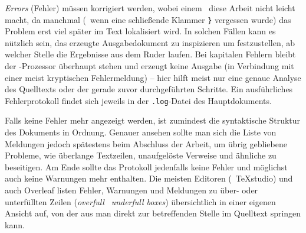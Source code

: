 \noindent
\emph{Errors} (Fehler) müssen korrigiert werden, wobei einem \latex\ diese
Arbeit nicht leicht macht, da manchmal (\zB\ wenn eine schließende Klammer
\verb!}! vergessen wurde) das Problem erst viel später im Text lokalisiert
wird. In solchen Fällen kann es nützlich sein, das erzeugte Ausgabedokument
zu inspizieren um festzustellen, ab welcher Stelle die Ergebnisse aus dem
Ruder laufen. Bei kapitalen Fehlern bleibt der \latex-Prozessor überhaupt
stehen und erzeugt keine Ausgabe (in Verbindung mit einer meist kryptischen
Fehlermeldung) -- hier hilft meist nur eine genaue Analyse des Quelltexts
oder der gerade zuvor durchgeführten Schritte. Ein ausführliches
Fehlerprotokoll findet sich jeweils in der \verb!.log!-Datei des Hauptdokuments.

Falls keine Fehler mehr angezeigt werden, ist zumindest die syntaktische
Struktur des Dokuments in Ordnung. Genauer ansehen sollte man sich die Liste
von Meldungen jedoch spätestens beim Abschluss der Arbeit, um übrig
gebliebene Probleme, wie überlange Textzeilen, unaufgelöste Verweise und
ähnliche zu beseitigen. Am Ende sollte das Protokoll jedenfalls keine Fehler
und möglichst auch keine Warnungen mehr enthalten. Die meisten Editoren (\zB\
\textsf{TeXstudio}) und auch \textsf{Overleaf} listen Fehler, Warnungen und
Meldungen zu über- oder unterfüllten Zeilen (\emph{overfull} \bzw\
\emph{underfull boxes}) übersichtlich in einer eigenen Ansicht auf, von der aus
man direkt zur betreffenden Stelle im Quelltext springen kann.
